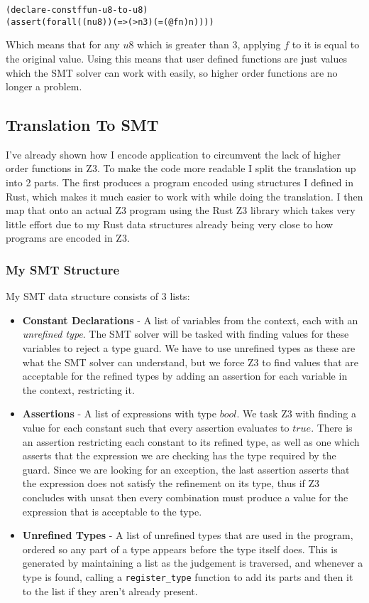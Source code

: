 \begin{alltt}
    (declare-const f fun-u8-to-u8)
    (assert (forall ((n u8)) (=> (> n 3) (= (@ f n) n))))
\end{alltt}

Which means that for any $u8$ which is greater than 3, applying $f$ to it is equal to the original value.
Using this means that user defined functions are just values which the SMT solver can work with
easily, so higher order functions are no longer a problem.

\subsection{Translation To SMT}

I've already shown how I encode application to circumvent the lack of higher order functions in Z3.
To make the code more readable I split the translation up into 2 parts.
The first produces a program encoded using structures I defined in Rust, which makes it much easier
to work with while doing the translation.
I then map that onto an actual Z3 program using the Rust Z3 library which takes very little effort
due to my Rust data structures already being very close to how programs are encoded in Z3.

\subsubsection{My SMT Structure}

My SMT data structure consists of 3 lists:

\begin{itemize}
    \item \textbf{Constant Declarations} -
    A list of variables from the context, each with an \textit{unrefined type}.
    The SMT solver will be tasked with finding values for these variables to reject a type guard.
    We have to use unrefined types as these are what the SMT solver can understand, but we force
    Z3 to find values that are acceptable for the refined types by adding an assertion for each
    variable in the context, restricting it.
    \item \textbf{Assertions} -
    A list of expressions with type $bool$.
    We task Z3 with finding a value for each constant such that every assertion evaluates to $true$.
    There is an assertion restricting each constant to its refined type, as well as one which asserts
    that the expression we are checking has the type required by the guard.
    Since we are looking for an exception, the last assertion asserts that the expression does not
    satisfy the refinement on its type, thus if Z3 concludes with unsat then every combination must
    produce a value for the expression that is acceptable to the type.
    \item \textbf{Unrefined Types} -
    A list of unrefined types that are used in the program, ordered so any part of a type appears
    before the type itself does.
    This is generated by maintaining a list as the judgement is traversed, and whenever a type is
    found, calling a \texttt{register\_type} function to add its parts and then it to the list if
    they aren't already present.
\end{itemize}

